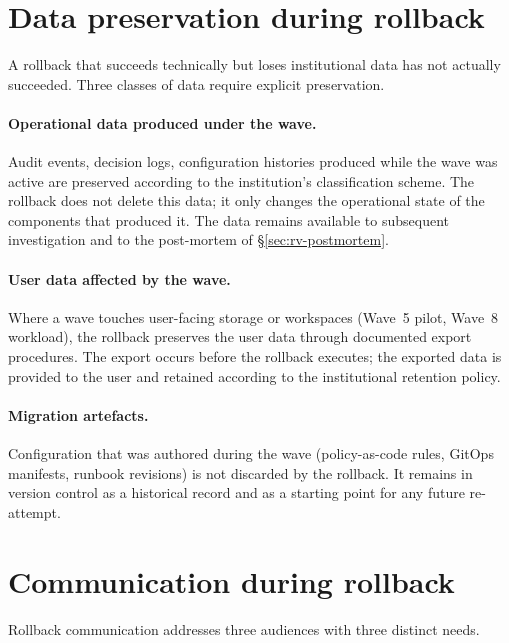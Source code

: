 \section{Data preservation during rollback}
\label{sec:rv-data}

A rollback that succeeds technically but loses institutional data
has not actually succeeded. Three classes of data require explicit
preservation.

\paragraph{Operational data produced under the wave.} Audit
events, decision logs, configuration histories produced while the
wave was active are preserved according to the institution's
classification scheme. The rollback does not delete this data; it
only changes the operational state of the components that produced
it. The data remains available to subsequent investigation and to
the post-mortem of \S\ref{sec:rv-postmortem}.

\paragraph{User data affected by the wave.} Where a wave touches
user-facing storage or workspaces (Wave~5 pilot, Wave~8 workload),
the rollback preserves the user data through documented export
procedures. The export occurs before the rollback executes; the
exported data is provided to the user and retained according to the
institutional retention policy.

\paragraph{Migration artefacts.} Configuration that was authored
during the wave (policy-as-code rules, GitOps manifests, runbook
revisions) is not discarded by the rollback. It remains in version
control as a historical record and as a starting point for any
future re-attempt.

\section{Communication during rollback}
\label{sec:rv-communication}

Rollback communication addresses three audiences with three
distinct needs.

